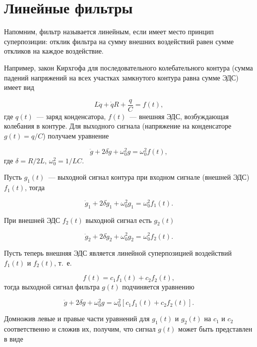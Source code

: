 
\section{Линейные фильтры}

Напомним, фильтр называется линейным, если имеет место принцип суперпозиции:
отклик фильтра на сумму внешних воздействий
равен сумме откликов на каждое воздействие.

Например, закон Кирхгофа для последовательного колебательного контура (сумма
падений напряжений на всех участках
замкнутого контура равна сумме ЭДС) имеет вид

\begin{equation*}
    L\ddot{q}+\dot{q}R+\frac{q}{C}=f(t),
\end{equation*}
где $q(t)$~--- заряд конденсатора, $f(t)$~--- внешняя ЭДС, возбуждающая
колебания в контуре. Для выходного сигнала
(напряжение на конденсаторе $g(t)=q/C$) получаем уравнение

\begin{equation*}
    \ddot{g}+2\delta\dot{g}+\omega_0^2 g=\omega_0^2 f(t),
\end{equation*}
где $\delta=R/2L$, $\omega_0^2=1/LC$.

Пусть $g_1(t)$~--- выходной сигнал контура при входном сигнале (внешней ЭДС)
$f_1(t)$, тогда

\begin{equation*}
    \ddot{g}_1+2\delta \dot{g}_1 +\omega_0^2 g_1=\omega_0^2 f_1(t).
\end{equation*}

При внешней ЭДС $f_2(t)$ выходной сигнал есть $g_2(t)$

\begin{equation*}
    \ddot{g}_2+2\delta \dot{g}_2+\omega_0^2g_2=\omega_0^2 f_2(t).
\end{equation*}

Пусть теперь внешняя ЭДС является линейной суперпозицией воздействий $f_1(t)$ и
$f_2(t)$, т.~е.

\begin{equation*}
    f(t)=c_1f_1(t)+c_2f_2(t),
\end{equation*}
тогда выходной сигнал фильтра $g(t)$ подчиняется уравнению

\begin{equation*}
    \ddot{g}+2\delta\dot{g}+\omega_0^2g=\omega_0^2[c_1f_1(t)+c_2f_2(t)].
\end{equation*}

Домножив левые и правые части уравнений для $g_1(t)$ и $g_2(t)$ на $c_1$ и $c_2$
соответственно и сложив их, получим,
что сигнал $g(t)$ может быть представлен в виде

